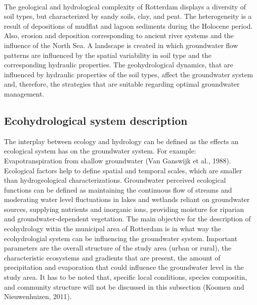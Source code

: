\\
The geological and hydrological complexity of Rotterdam displays a diversity of soil types, but characterized by sandy soils, clay, and peat. The heterogeneity is a result of depositions of mudflat and lagoon sediments during the Holocene period. Also, erosion and deposition corresponding to ancient river systems and the influence of the North Sea. A landscape is created in which groundwater flow patterns are influenced by the spatial variability in soil type and the corresponding hydraulic properties. The geohydrological dynamics, that are influenced by hydraulic properties of the soil types, affect the groundwater system and, therefore, the strategies that are suitable regarding optimal groundwater management. 

\subsection{Ecohydrological system description}
The interplay between ecology and hydrology can be defined as the effects an ecological system has on the groundwater system. For example: Evapotranspiration from shallow groundwater (Van Ganswijk et al., 1988). Ecological factors help to define spatial and temporal scales, which are smaller than hydrogeological characterizations. Groundwater perceived ecological functions can be defined as maintaining the continuous flow of streams and moderating water level fluctuations in lakes and wetlands reliant on groundwater sources, supplying nutrients and inorganic ions, providing moisture for riparian and groundwater-dependent vegetation. The main objective for the description of ecohydrology witin the municipal area of Rotterdam is in what way the ecohydrologial system can be influencing the groundwater system. Important parameters are the overall structure of the study area (urban or rural), the characteristic ecosystems and gradients that are present, the amount of precipitation and evaporation that could influence the groundwater level in the study area. It has to be noted that, specific local conditions, species compositin, and community structure will not be discussed in this subsection (Koomen and Nieuwenhuizen, 2011).\\
\\
